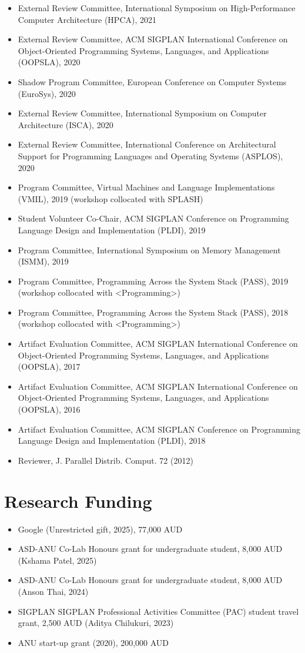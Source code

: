 \documentclass[singlecolumn,singlespace,11pt,a4paper]{article}
\begin{document}
\begin{itemize}
\item External Review Committee, International Symposium on High-Performance Computer Architecture (HPCA), 2021
\item External Review Committee, ACM SIGPLAN International Conference on Object-Oriented Programming Systems, Languages, and Applications (OOPSLA), 2020
\item Shadow Program Committee, European Conference on Computer Systems (EuroSys), 2020
\item External Review Committee, International Symposium on Computer Architecture (ISCA), 2020
\item External Review Committee, International Conference on Architectural Support for Programming Languages and Operating Systems (ASPLOS), 2020
\item Program Committee, Virtual Machines and Language Implementations (VMIL), 2019 (workshop collocated with SPLASH)
\item Student Volunteer Co-Chair, ACM SIGPLAN Conference on Programming Language Design and Implementation (PLDI), 2019
\item Program Committee, International Symposium on Memory Management (ISMM), 2019
\item Program Committee, Programming Across the System Stack (PASS), 2019 (workshop collocated with <Programming>) 
\item Program Committee, Programming Across the System Stack (PASS), 2018 (workshop collocated with  <Programming>) 
\item Artifact Evaluation Committee, ACM SIGPLAN International Conference on Object-Oriented Programming Systems, Languages, and Applications (OOPSLA), 2017  
\item Artifact Evaluation Committee, ACM SIGPLAN International Conference on Object-Oriented Programming Systems, Languages, and Applications (OOPSLA), 2016  
\item Artifact Evaluation Committee, ACM SIGPLAN Conference on Programming Language Design and Implementation (PLDI), 2018
\item Reviewer, J. Parallel Distrib. Comput. 72 (2012) 
\end{itemize}

\section*{Research Funding}
\begin{itemize}
\item Google (Unrestricted gift, 2025), 77,000 AUD
\item ASD-ANU Co-Lab Honours grant for undergraduate student, 8,000 AUD (Kshama Patel, 2025) 
\item ASD-ANU Co-Lab Honours grant for undergraduate student, 8,000 AUD (Anson Thai, 2024)
\item SIGPLAN SIGPLAN Professional Activities Committee (PAC) student travel grant, 2,500 AUD (Aditya Chilukuri, 2023)
\item ANU start-up grant (2020), 200,000 AUD
\end{itemize}
\end{document}
